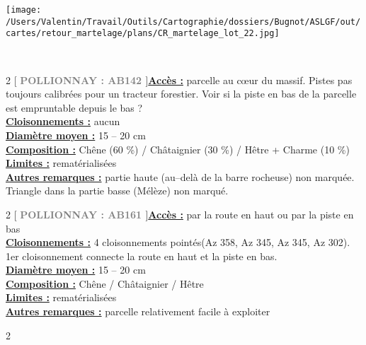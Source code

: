\documentclass[a4paper,openany]{book}\usepackage[]{graphicx}\usepackage[]{color}
\begin{document}
\begin{center}
\texttt{[image: /Users/Valentin/Travail/Outils/Cartographie/dossiers/Bugnot/ASLGF/out/cartes/retour\_martelage/plans/CR\_martelage\_lot\_22.jpg]}
\end{center}\newpage\noindent
{}\\\begin{multicols}{2}
[
\textbf{\textcolor{gray}{
\large POLLIONNAY : AB142
}}
]\noindent\textbf{\underline{Accès :}} parcelle au c\oe ur du massif. Pistes pas toujours calibrées pour un tracteur forestier. Voir si la piste en bas de la parcelle est empruntable depuis le bas ?\vspace{0.1cm} \\\noindent\textbf{\underline{Cloisonnements :}} aucun\vspace{0.1cm} \\\noindent\textbf{\underline{Diamètre moyen :}} 15 -- 20 cm\vspace{0.1cm} \\\noindent\textbf{\underline{Composition :}} Chêne (60 \%) / Châtaignier (30 \%) / Hêtre + Charme (10 \%)\vspace{0.1cm} \\\noindent\textbf{\underline{Limites :}} rematérialisées\vspace{0.1cm} \\\noindent\textbf{\underline{Autres remarques :}} partie haute (au--delà de la barre rocheuse) non marquée. Triangle dans la partie basse  (Mélèze) non marqué.\vspace{0.1cm} \\\end{multicols}\begin{multicols}{2}
[
\textbf{\textcolor{gray}{
\large POLLIONNAY : AB161
}}
]\noindent\textbf{\underline{Accès :}} par la route en haut ou par la piste en bas\vspace{0.1cm} \\\noindent\textbf{\underline{Cloisonnements :}} 4 cloisonnements pointés(Az 358, Az 345, Az 345, Az 302). 1er cloisonnement connecte la route en haut et la piste en bas.\vspace{0.1cm} \\\noindent\textbf{\underline{Diamètre moyen :}} 15 -- 20 cm\vspace{0.1cm} \\\noindent\textbf{\underline{Composition :}} Chêne / Châtaignier / Hêtre\vspace{0.1cm} \\\noindent\textbf{\underline{Limites :}} rematérialisées\vspace{0.1cm} \\\noindent\textbf{\underline{Autres remarques :}} parcelle relativement facile à exploiter\vspace{0.1cm} \\\end{multicols}\begin{multicols}{2}

\end{multicols}
\end{document}

